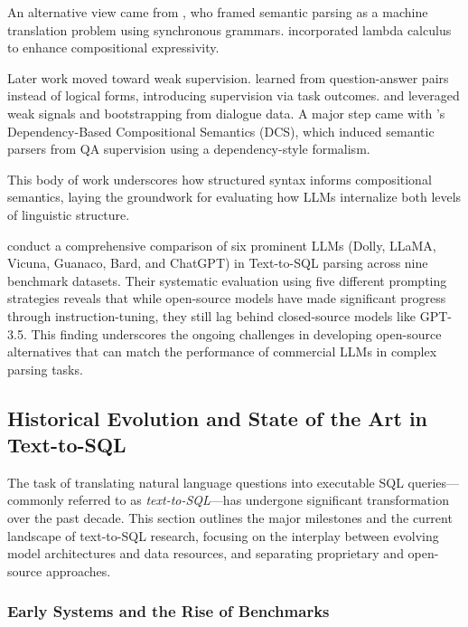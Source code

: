 An alternative view came from \citet{wong2006learning}, who framed semantic parsing as a machine translation problem using synchronous grammars. \citet{wong2007} incorporated lambda calculus to enhance compositional expressivity.

Later work moved toward weak supervision. \citet{clarke2010} learned from question-answer pairs instead of logical forms, introducing supervision via task outcomes. \citet{goldwasser2011confidence} and \citet{artzi2011} leveraged weak signals and bootstrapping from dialogue data. A major step came with \citet{liang2013learning}'s Dependency-Based Compositional Semantics (DCS), which induced semantic parsers from QA supervision using a dependency-style formalism.

This body of work underscores how structured syntax informs compositional semantics, laying the groundwork for evaluating how LLMs internalize both levels of linguistic structure.

\citet{sun-etal-2023-battle} conduct a comprehensive comparison of six prominent LLMs (Dolly, LLaMA, Vicuna, Guanaco, Bard, and ChatGPT) in Text-to-SQL parsing across nine benchmark datasets. Their systematic evaluation using five different prompting strategies reveals that while open-source models have made significant progress through instruction-tuning, they still lag behind closed-source models like GPT-3.5. This finding underscores the ongoing challenges in developing open-source alternatives that can match the performance of commercial LLMs in complex parsing tasks.

\subsection{Historical Evolution and State of the Art in Text-to-SQL}

The task of translating natural language questions into executable SQL queries---commonly referred to as \emph{text-to-SQL}---has undergone significant transformation over the past decade. This section outlines the major milestones and the current landscape of text-to-SQL research, focusing on the interplay between evolving model architectures and data resources, and separating proprietary and open-source approaches.

\subsubsection{Early Systems and the Rise of Benchmarks}

